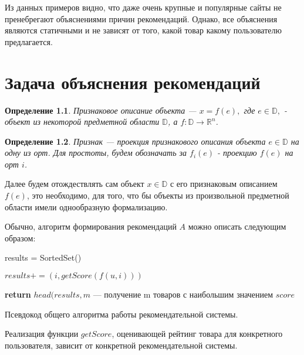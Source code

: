 \documentclass[12pt,a4paper]{report}
\begin{document}
Из данных примеров видно, что даже очень крупные и популярные сайты не пренебрегают объяснениями причин рекомендаций. Однако, все объяснения являются статичными и не зависят от того, какой товар какому пользователю предлагается.


\chapter{Задача объяснения рекомендаций}
\newtheorem{Def}{Определение}
\begin{Def}
Признаковое описание объекта --- $x = f(e),$ где $e \in \mathbb{D},$ - объект из некоторой предметной области $\mathbb{D}$, а $f: \mathbb{D}  \to \mathbb{R}^n$.
\end{Def}

\begin{Def}
Признак --- проекция признакового описания объекта $e \in \mathbb{D}$ на одну из орт. Для простоты, будем обозначать за $f_i(e)$ - проекцию $f(e)$ на орт $i$.
\end{Def}

Далее будем отождествлять сам объект $x \in \mathbb{D}$ с его признаковым описанием $f(e)$, это необходимо, для того, что бы объекты из произвольной предметной области имели однообразную формализацию.

Обычно, алгоритм формирования рекомендаций $A$ можно описать следующим образом:


\begin{algorithm}[H]
\SetAlgoLined
{}

results = SortedSet()

 {
	
	$results += (i, getScore(f(u, i)))$
	
}

\textbf{return} $head(results, m$ --- получение m товаров с наибольшим значением $score$

\caption{Псевдокод общего алгоритма работы рекомендательной системы.}
\label{alg:GENERALRS}
\end{algorithm}

Реализация функции $getScore$, оценивающей рейтинг товара для конкретного пользователя, зависит от конкретной рекомендательной системы.
\end{document}

